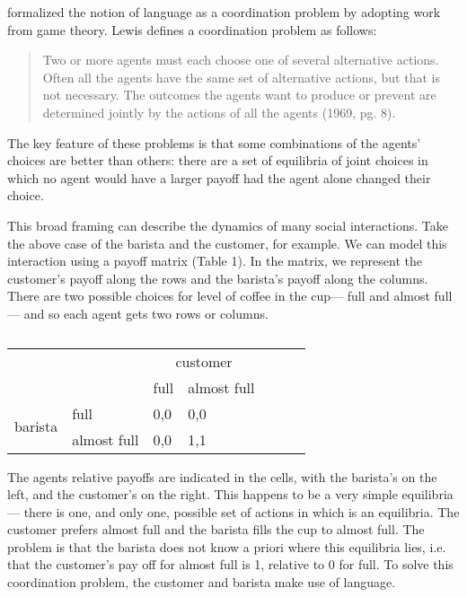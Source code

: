 \documentclass[man, noapacite, 12pt]{apa2}
\begin{document}
 formalized the notion of language as a coordination problem by adopting work from game theory. Lewis defines a coordination problem as follows: \begin{quote} Two or more agents must each choose one of several alternative actions. Often all the agents have the same set of alternative actions, but that is not necessary. The outcomes the agents want to produce or prevent are determined jointly by the actions of all the agents (1969, pg. 8).
\end{quote} 
The key feature of these problems is that some combinations of the agents' choices are better than others: there are a set of equilibria of joint choices in which no agent would have a larger payoff had the agent alone changed their choice.

This broad framing can describe the dynamics of many social interactions. Take the above case of the barista and the customer, for example. We can model this interaction using a payoff matrix (Table 1). In the matrix, we represent the customer's payoff along the rows and the barista's payoff along the columns. There are two possible choices for  level of coffee in the cup---  full and  almost full --- and so each agent gets two rows or columns. 
\begin{table}[t]
\begin{center}
\begin{tabular}{l p{3cm} l p{3cm} l p{3cm} l}
 &  & \multicolumn{2}{c}{customer} \\ \cline{2-4} 
\multicolumn{1}{l|}{} & \multicolumn{1}{l|}{} & \multicolumn{1}{l|}{full} & \multicolumn{1}{l|}{almost full} \\ \cline{2-4} 
\multicolumn{1}{c|}{\multirow{2}{*}{barista}} & \multicolumn{1}{l|}{full} & \multicolumn{1}{l|}{0,0} & \multicolumn{1}{l|}{0,0} \\ \cline{2-4} 
\multicolumn{1}{c|}{} & \multicolumn{1}{l|}{almost full} & \multicolumn{1}{l|}{0,0} & \multicolumn{1}{l|}{1,1} \\ \cline{2-4} 
\end{tabular}
\caption{}
\end{center}
\end{table}
The agents relative payoffs are indicated in the cells, with the barista's on the left, and the customer's on the right. This happens to be a very simple equilibria --- there is one, and only one, possible set of actions in which is an equilibria. The customer prefers almost full and the barista fills the cup to almost full. The problem is that the barista does not know a priori where this equilibria lies, i.e. that the customer's pay off for almost full is 1, relative to 0 for full. To solve this coordination problem, the customer and barista make use of language.
\end{document}
